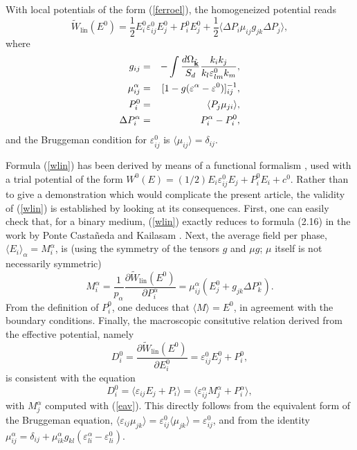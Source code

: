 With local potentials of the form (\ref{ferroel}), the homogeneized 
potential reads
\begin{equation}
\label{wlin}
\tilde{W}_{\text{lin}}(E^0)=\frac{1}{2}E^0_i \varepsilon^0_{ij}E^0_j
+P^0_i E^0_j +\frac{1}{2}\langle \Delta P_i \mu_{ij} g_{jk} \Delta P_j\rangle,
\end{equation}
where
\begin{eqnarray}
g_{ij}&=&-\int \frac{d\Omega_{\hat {\bf k}}}{S_d} \frac{ k_i k_j}
{k_l \varepsilon^0_{lm} k_m},\\
\mu_{ij}^\alpha&=&[1-g(\varepsilon^\alpha-\varepsilon^0)]^{-1}_{ij},\\
P^0_i&=&\langle P_j\mu_{ji}\rangle,\\
\Delta P_i^\alpha&=&P_i^\alpha-P^0_i,
\end{eqnarray}
and the Bruggeman condition for $\varepsilon^0_{ij}$ is 
$\langle \mu_{ij}\rangle=\delta_{ij}$.

Formula (\ref{wlin}) has been derived by means of a functional formalism 
\cite{PELL99}, used with a trial potential of the form \cite{PELL99b} 
$W^0(E)=(1/2)E_i\varepsilon^0_{ij} E_j+P^0_i E_i+c^0$. Rather than to 
give a demonstration which would complicate the present article, the 
validity of (\ref{wlin}) is established by looking at its consequences. 
First, one can easily check that, for a binary medium, (\ref{wlin}) 
exactly reduces to formula (2.16) in the work by Ponte Casta\~neda 
and Kailasam \cite{PONT97}. Next, the average field per phase, 
$\langle E_i\rangle_\alpha=M^\alpha_i$, is (using the symmetry of the 
tensors $g$ and $\mu g$; $\mu$ itself is not necessarily symmetric)
\begin{equation}
\label{eav}
M^\alpha_i=\frac{1}{p_\alpha}\frac{\partial 
\tilde{W}_{\text{lin}}(E^0)}{\partial P_i^\alpha}=\mu^\alpha_{ij}
( E^0_j+g_{jk}\Delta P_k^\alpha).
\end{equation}
From the definition of $P^0_i$, one deduces that $\langle M\rangle=E^0$, 
in agreement with the boundary conditions. Finally, the macroscopic 
consitutive relation derived from the effective potential, namely
\begin{equation}
D^0_i=\frac{\partial \tilde{W}_{\text{lin}}(E^0)}{\partial E^0_i}
=\varepsilon_{ij}^0 E^0_j+P^0_i,
\end{equation}
is consistent with the equation
\begin{equation}
D^0_i=\langle \varepsilon_{ij} E_j+P_i\rangle
=\langle\varepsilon^\alpha_{ij} M_j^\alpha +P_i^\alpha\rangle,
\end{equation}
with $M_j^\alpha$ computed with (\ref{eav}). This directly follows 
from the equivalent form of the Bruggeman equation, 
$\langle \varepsilon_{ij}\mu_{jk} \rangle=\varepsilon^0_{ij}\langle 
\mu_{jk}\rangle=\varepsilon^0_{ij}$, and from the identity 
$\mu_{ij}^\alpha=\delta_{ij}+\mu_{ik}^\alpha g_{kl}
(\varepsilon_{li}^\alpha-\varepsilon^0_{li})$.

